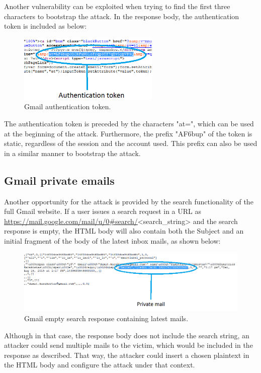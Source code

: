 Another vulnerability can be exploited when trying to find the first three
characters to bootstrap the attack. In the response body, the authentication
token is included as below:

\begin{figure}[H] \caption{Gmail authentication token.} \centering
\includegraphics[width=0.6\textwidth]{diagrams/gmail_bootstrap.png}\end{figure}

The authentication token is preceded by the characters "at=", which can be used
at the beginning of the attack. Furthermore, the prefix "AF6bup" of the token is
static, regardless of the session and the account used. This prefix can also be
used in a similar manner to bootstrap the attack.

\subsection{Gmail private emails}\label{subsec:gmail_mail}

Another opportunity for the attack is provided by the search functionality of
the full Gmail website. If a user issues a search request in a URL as
\url{https://mail.google.com/mail/u/0#search/}<search\_string> and the search
response is empty, the HTML body will also contain both the Subject and an
initial fragment of the body of the latest inbox mails, as shown below:

\begin{figure}[H] \caption{Gmail empty search response containing latest mails.}
\centering
\includegraphics[width=1.1\textwidth]{diagrams/gmail_plain_response.png}\end{figure}

Although in that case, the response body does not include the search string, an
attacker could send multiple mails to the victim, which would be included in the
response as described. That way, the attacker could insert a chosen plaintext in
the HTML body and configure the attack under that context.


